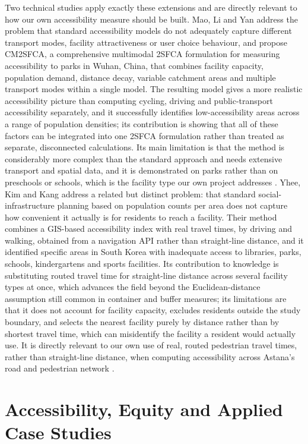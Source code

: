 \documentclass[journal]{IEEEtran}
\begin{document}
Two technical studies apply exactly these extensions and are directly relevant to how our own accessibility measure should be built. Mao, Li and Yan address the problem that standard accessibility models do not adequately capture different transport modes, facility attractiveness or user choice behaviour, and propose CM2SFCA, a comprehensive multimodal 2SFCA formulation for measuring accessibility to parks in Wuhan, China, that combines facility capacity, population demand, distance decay, variable catchment areas and multiple transport modes within a single model. The resulting model gives a more realistic accessibility picture than computing cycling, driving and public-transport accessibility separately, and it successfully identifies low-accessibility areas across a range of population densities; its contribution is showing that all of these factors can be integrated into one 2SFCA formulation rather than treated as separate, disconnected calculations. Its main limitation is that the method is considerably more complex than the standard approach and needs extensive transport and spatial data, and it is demonstrated on parks rather than on preschools or schools, which is the facility type our own project addresses \cite{mao2023wuhan}. Yhee, Kim and Kang address a related but distinct problem: that standard social-infrastructure planning based on population counts per area does not capture how convenient it actually is for residents to reach a facility. Their method combines a GIS-based accessibility index with real travel times, by driving and walking, obtained from a navigation API rather than straight-line distance, and it identified specific areas in South Korea with inadequate access to libraries, parks, schools, kindergartens and sports facilities. Its contribution to knowledge is substituting routed travel time for straight-line distance across several facility types at once, which advances the field beyond the Euclidean-distance assumption still common in container and buffer measures; its limitations are that it does not account for facility capacity, excludes residents outside the study boundary, and selects the nearest facility purely by distance rather than by shortest travel time, which can misidentify the facility a resident would actually use. It is directly relevant to our own use of real, routed pedestrian travel times, rather than straight-line distance, when computing accessibility across Astana's road and pedestrian network \cite{kim2021gis}.

\section{Accessibility, Equity and Applied Case Studies}
\label{sec:equity}
\end{document}
